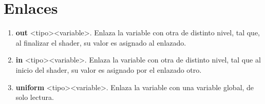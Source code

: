 \section{Enlaces\label{sec:enlaces}}
\begin{enumerate}
    \item \textbf{out} \textless tipo\textgreater \textless variable\textgreater. Enlaza la variable con otra de distinto nivel, tal que, al finalizar el shader, su valor es asignado al enlazado.
    \item \textbf{in} \textless tipo\textgreater \textless variable\textgreater . Enlaza la variable con otra de distinto nivel, tal que al inicio del shader, su valor es asignado por el enlazado otro.
    \item \textbf{uniform} \textless tipo\textgreater \textless variable\textgreater. Enlaza la variable con una variable global, de solo lectura.
\end{enumerate}


